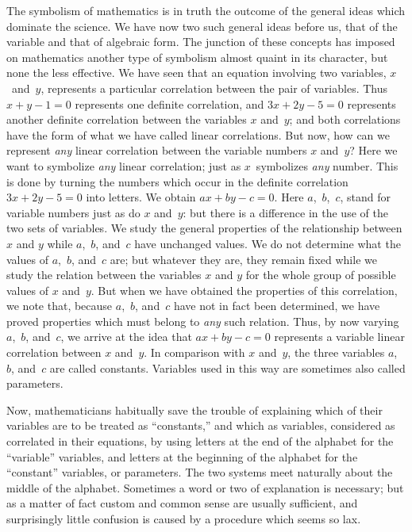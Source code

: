 \documentclass[12pt,leqno]{book}[2005/09/16]
\newcommand{\PageSep}[1]{\ignorespaces}
\begin{document}
The symbolism of mathematics is in truth
the outcome of the general ideas which
dominate the science. We have now two
such general ideas before us, that of the variable
and that of algebraic form. The junction
of these concepts has imposed on mathematics
another type of symbolism almost quaint in
its character, but none the less effective. We
have seen that an equation involving two
variables, $x$~and~$y$, represents a particular
correlation between the pair of variables.
Thus $x + y - 1 = 0$ represents one definite correlation,
and $3x + 2y - 5 = 0$ represents another
definite correlation between the variables $x$
and~$y$; and both correlations have the form
of what we have called linear correlations.
But now, how can we represent \emph{any} linear
correlation between the variable numbers $x$
and~$y$? Here we want to symbolize \emph{any}
linear correlation; just as $x$~symbolizes \emph{any}
\PageSep{69}
number. This is done by turning the numbers
which occur in the definite correlation $3x + 2y - 5 = 0$
into letters. We obtain $ax + by -  c = 0$.
Here $a$,~$b$,~$c$, stand for variable numbers just
as do $x$ and~$y$: but there is a difference in the
use of the two sets of variables. We study
the general properties of the relationship between
$x$ and $y$ while $a$,~$b$, and~$c$ have unchanged
values. We do not determine what
the values of $a$,~$b$, and~$c$ are; but whatever
they are, they remain fixed while we study
the relation between the variables $x$ and $y$
for the whole group of possible values of $x$
and~$y$. But when we have obtained the properties
of this correlation, we note that, because
$a$,~$b$, and~$c$ have not in fact been determined,
we have proved properties which must
belong to \emph{any} such relation. Thus, by now
varying $a$,~$b$, and~$c$, we arrive at the idea that
$ax + by - c = 0$ represents a variable linear
correlation between $x$ and~$y$. In comparison
with $x$ and~$y$, the three variables $a$,~$b$, and~$c$
are called constants. Variables used in this
%
way are sometimes also called parameters.
%

Now, mathematicians habitually save the
trouble of explaining which of their variables
are to be treated as ``constants,'' and which
as variables, considered as correlated in their
equations, by using letters at the end of the
alphabet for the ``variable'' variables, and
letters at the beginning of the alphabet for
\PageSep{70}
the ``constant'' variables, or parameters.
The two systems meet naturally about the
middle of the alphabet. Sometimes a word
or two of explanation is necessary; but as a
matter of fact custom and common sense are
usually sufficient, and surprisingly little confusion
is caused by a procedure which seems
so lax.
\end{document}
